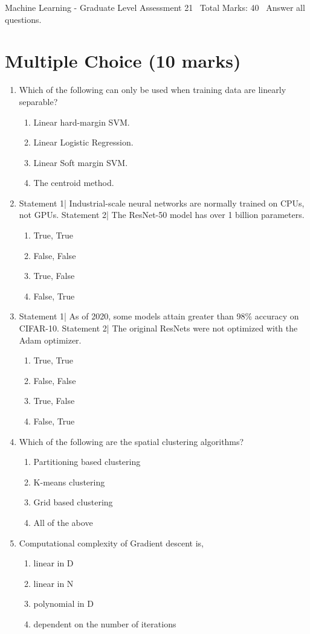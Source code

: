 \documentclass[12pt]{article}
\begin{document}
\begin{center}
Machine Learning - Graduate Level Assessment 21 \
Total Marks: 40 \
Answer all questions.
\end{center}

\section*{Multiple Choice (10 marks)}
\begin{enumerate}[label=\arabic*.]
\item Which of the following can only be used when training data are linearly separable?
\begin{enumerate}[label=(\alph*)]
    \item Linear hard-margin SVM.
    \item Linear Logistic Regression.
    \item Linear Soft margin SVM.
    \item The centroid method.
\end{enumerate}
\item Statement 1| Industrial-scale neural networks are normally trained on CPUs, not GPUs. Statement 2| The ResNet-50 model has over 1 billion parameters.
\begin{enumerate}[label=(\alph*)]
    \item True, True
    \item False, False
    \item True, False
    \item False, True
\end{enumerate}
\item Statement 1| As of 2020, some models attain greater than 98\% accuracy on CIFAR-10. Statement 2| The original ResNets were not optimized with the Adam optimizer.
\begin{enumerate}[label=(\alph*)]
    \item True, True
    \item False, False
    \item True, False
    \item False, True
\end{enumerate}
\item Which of the following are the spatial clustering algorithms?
\begin{enumerate}[label=(\alph*)]
    \item Partitioning based clustering
    \item K-means clustering
    \item Grid based clustering
    \item All of the above
\end{enumerate}
\item Computational complexity of Gradient descent is,
\begin{enumerate}[label=(\alph*)]
    \item linear in D
    \item linear in N
    \item polynomial in D
    \item dependent on the number of iterations
\end{enumerate}
\end{enumerate}
\end{document}
